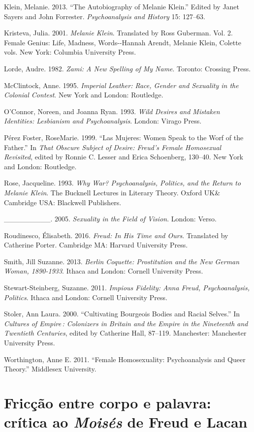 Klein, Melanie. 2013. ``The Autobiography of Melanie Klein.'' Edited by
Janet Sayers and John Forrester. \emph{Psychoanalysis and History} 15:
127--63.

Kristeva, Julia. 2001. \emph{Melanie Klein}. Translated by Ross
Guberman. Vol. 2. Female Genius: Life, Madness, Words-\/-Hannah Arendt,
Melanie Klein, Colette vols. New York: Columbia University Press.

Lorde, Audre. 1982. \emph{Zami: A New Spelling of My Name}. Toronto:
Crossing Press.

McClintock, Anne. 1995. \emph{Imperial Leather: Race, Gender and
Sexuality in the Colonial Contest}. New York and London: Routledge.

O'Connor, Noreen, and Joanna Ryan. 1993. \emph{Wild Desires and Mistaken
Identities: Lesbianism and Psychoanalysis}. London: Virago Press.

Pérez Foster, RoseMarie. 1999. ``Las Mujeres: Women Speak to the Worf of
the Father.'' In \emph{That Obscure Subject of Desire: Freud's Female
Homosexual Revisited}, edited by Ronnie C. Lesser and Erica Schoenberg,
130--40. New York and London: Routledge.

Rose, Jacqueline. 1993. \emph{Why War? Psychoanalysis, Politics, and the
Return to Melanie Klein}. The Bucknell Lectures in Literary Theory.
Oxford UK\& Cambridge USA: Blackwell Publishers.

\_\_\_\_\_\_\_\_\_. 2005. \emph{Sexuality in the Field of Vision}. London: Verso.

Roudinesco, Élisabeth. 2016. \emph{Freud: In His Time and Ours}.
Translated by Catherine Porter. Cambridge MA: Harvard University Press.

Smith, Jill Suzanne. 2013. \emph{Berlin Coquette: Prostitution and the
New German Woman, 1890-1933}. Ithaca and London: Cornell University
Press.

Stewart-Steinberg, Suzanne. 2011. \emph{Impious Fidelity: Anna Freud,
Psychoanalysis, Politics}. Ithaca and London: Cornell University Press.

Stoler, Ann Laura. 2000. ``Cultivating Bourgeois Bodies and Racial
Selves.'' In \emph{Cultures of Empire\,: Colonizers in Britain and the
Empire in the Nineteenth and Twentieth Centuries}, edited by Catherine
Hall, 87--119. Manchester: Manchester University Press.

Worthington, Anne E. 2011. ``Female Homosexuality: Psychoanalysis and
Queer Theory.'' Middlesex University.

\chapter*{Fricção entre corpo e palavra: crítica ao \emph{Moisés} de Freud e Lacan}

